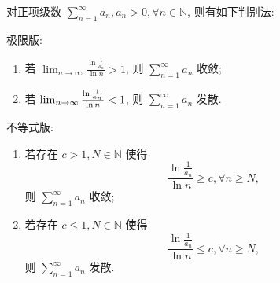 \documentclass[../../main.tex]{subfiles}
\begin{document}
\begin{theorem}[对数判别法]\label{theorem:级数-对数判别法}
对正项级数 \( \sum_{n=1}^\infty a_n, a_n > 0, \forall n \in \mathbb{N} \), 则有如下判别法:

极限版:
\begin{enumerate}
\item 若 \( \lim_{n \to \infty} \frac{\ln \frac{1}{a_n}}{\ln n} > 1 \), 则 \( \sum_{n=1}^\infty a_n \) 收敛;

\item 若 \( \varlimsup_{n \to \infty} \frac{\ln \frac{1}{a_n}}{\ln n} < 1 \), 则 \( \sum_{n=1}^\infty a_n \) 发散.
\end{enumerate}

不等式版:
\begin{enumerate}
\item 若存在 \( c > 1, N \in \mathbb{N} \) 使得
\[
\frac{\ln \frac{1}{a_n}}{\ln n} \geqslant c, \forall n \geqslant N,
\]
则 \( \sum_{n=1}^\infty a_n \) 收敛;

\item 若存在 \( c \leqslant 1, N \in \mathbb{N} \) 使得
\[
\frac{\ln \frac{1}{a_n}}{\ln n} \leqslant c, \forall n \geqslant N,
\]
则 \( \sum_{n=1}^\infty a_n \) 发散.
\end{enumerate}
\end{theorem}
\end{document}
